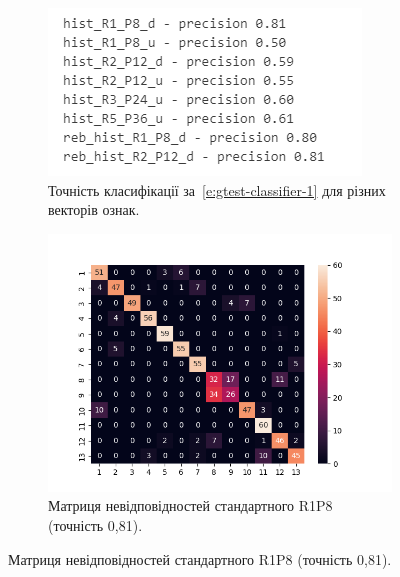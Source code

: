 \begin{figure}[h]
    \begin{subfigure}{0.5\textwidth}
    \includegraphics[width=0.95\linewidth]{img/precision-1.png} 
    \caption{
        Точність класифікації за~\eqref{e:gtest-classifier-1} для різних векторів ознак.
    }
    \end{subfigure}%
    \begin{subfigure}{0.5\textwidth}
    \includegraphics[width=0.95\linewidth]{img/confusion/hist_R1_P8_d.png}
    \caption{
        Матриця невідповідностей стандартного R1P8 (точність 0,81).
    }
    \end{subfigure}


\end{figure}
